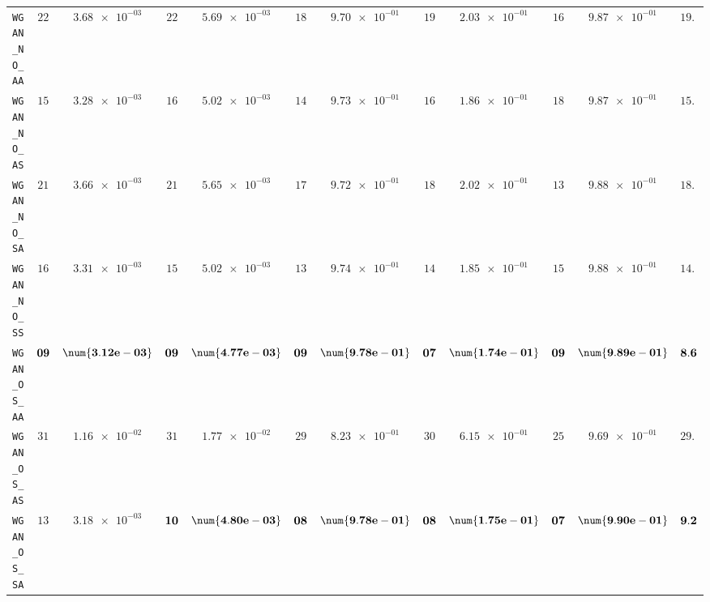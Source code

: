 \begin{xltabular}{\textwidth}{l||cC|cC|cC|cC|cC||c}
	\texttt{WGAN\_NO\_AA} & $ 22$ & $ \num{3.68e-03}$ & $ 22$ & $ \num{5.69e-03}$ & $ 18$ & $ \num{9.70e-01}$ & $ 19$ & $ \num{2.03e-01}$ & $ 16$ & $ \num{9.87e-01}$ & $ 19.4$  \\
	\texttt{WGAN\_NO\_AS} & $ 15$ & $ \num{3.28e-03}$ & $ 16$ & $ \num{5.02e-03}$ & $ 14$ & $ \num{9.73e-01}$ & $ 16$ & $ \num{1.86e-01}$ & $ 18$ & $ \num{9.87e-01}$ & $ 15.8$  \\
	\texttt{WGAN\_NO\_SA} & $ 21$ & $ \num{3.66e-03}$ & $ 21$ & $ \num{5.65e-03}$ & $ 17$ & $ \num{9.72e-01}$ & $ 18$ & $ \num{2.02e-01}$ & $ 13$ & $ \num{9.88e-01}$ & $ 18.0$  \\
	\texttt{WGAN\_NO\_SS} & $ 16$ & $ \num{3.31e-03}$ & $ 15$ & $ \num{5.02e-03}$ & $ 13$ & $ \num{9.74e-01}$ & $ 14$ & $ \num{1.85e-01}$ & $ 15$ & $ \num{9.88e-01}$ & $ 14.6$  \\
	\texttt{WGAN\_OS\_AA} & $\bf 09$ & $\bf \num{3.12e-03}$ & $\bf 09$ & $\bf \num{4.77e-03}$ & $\bf 09$ & $\bf \num{9.78e-01}$ & $\bf 07$ & $\bf \num{1.74e-01}$ & $\bf 09$ & $\bf \num{9.89e-01}$ & $\bf 8.6$  \\
	\texttt{WGAN\_OS\_AS} & $ 31$ & $ \num{1.16e-02}$ & $ 31$ & $ \num{1.77e-02}$ & $ 29$ & $ \num{8.23e-01}$ & $ 30$ & $ \num{6.15e-01}$ & $ 25$ & $ \num{9.69e-01}$ & $ 29.2$  \\
	\texttt{WGAN\_OS\_SA} & $ 13$ & $ \num{3.18e-03}$ & $\bf 10$ & $\bf \num{4.80e-03}$ & $\bf 08$ & $\bf \num{9.78e-01}$ & $\bf 08$ & $\bf \num{1.75e-01}$ & $\bf 07$ & $\bf \num{9.90e-01}$ & $\bf 9.2$  \\

\end{xltabular}
